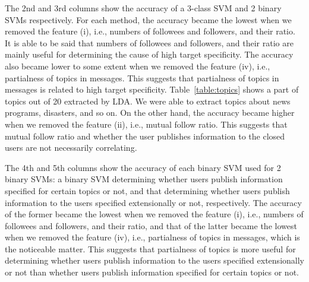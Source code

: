 The 2nd and 3rd columns show the accuracy of a 3-class SVM
and 2 binary SVMs respectively.  For each method, the accuracy became
the lowest when we removed the feature (i), i.e., numbers of followees and
followers, and their ratio.  It is able to be said that numbers of
followees and followers, and their ratio are mainly useful for
determining the cause of high target specificity.  The accuracy also
became lower to some extent when we removed the feature (iv), i.e.,
partialness of topics in messages.  This suggests that partialness of
topics in messages is related to high target specificity.
Table~\ref{table:topics} shows a part of topics out of 20 extracted by
LDA.  We were able to extract topics about news programs, disasters, and
so on.  On the other hand, the accuracy became higher when we removed
the feature (ii), i.e., mutual follow ratio.  This suggests that mutual
follow ratio and whether the user publishes information to the closed
users are not necessarily correlating.

The 4th and 5th columns show the accuracy of each binary SVM used for
2 binary SVMs: a binary SVM determining whether users publish
information specified for certain topics or not, and that determining
whether users publish information to the users specified extensionally
or not,
respectively.  The accuracy of the former became the lowest when we
removed the feature (i), i.e., numbers of followees and followers, and their
ratio, and that of the latter became the lowest when we removed the
feature (iv), i.e., partialness of topics in messages, which is the noticeable
matter.  This suggests that partialness of topics is more useful for
determining whether users publish information to the users specified
extensionally or not than whether users publish information specified
for certain topics or not.
